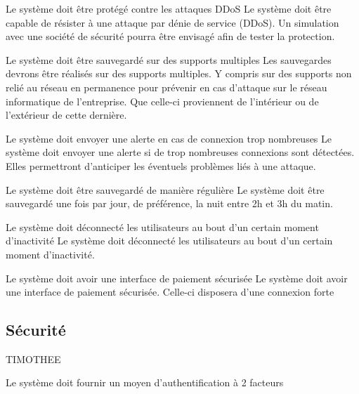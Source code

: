 \begin{reqs}{Le système doit être protégé contre les attaques DDoS}
Le système doit être capable de résister à une attaque par dénie de service (DDoS). Un simulation avec une société de sécurité pourra être envisagé afin de tester la protection.
\end{reqs}

\begin{reqs}{Le système doit être sauvegardé sur des supports multiples}
Les sauvegardes devrons être réalisés sur des supports multiples. Y compris sur des supports non relié au réseau en permanence pour prévenir en cas d'attaque sur le réseau informatique de l'entreprise. Que celle-ci proviennent de l'intérieur ou de l'extérieur de cette dernière.
\end{reqs}

\begin{reqs}{Le système doit envoyer une alerte en cas de connexion trop nombreuses}
Le système doit envoyer une alerte si de trop nombreuses connexions sont détectées. Elles permettront d'anticiper les éventuels problèmes liés à une attaque.
\end{reqs}

\begin{reqs}{Le système doit être sauvegardé de manière régulière}
Le système doit être sauvegardé une fois par jour, de préférence, la nuit entre 2h et 3h du matin.
\end{reqs}

\begin{reqs}{Le système doit déconnecté les utilisateurs au bout d'un certain moment d'inactivité}
Le système doit déconnecté les utilisateurs au bout d'un certain moment d'inactivité.
\end{reqs}

\begin{reqs}{Le système doit avoir une interface de paiement sécurisée}
Le système doit avoir une interface de paiement sécurisée. Celle-ci disposera d'une connexion forte 
\end{reqs}

\subsection{Sécurité}
TIMOTHEE\\
\begin{reqs}{Le système doit fournir un moyen d'authentification à 2 facteurs}
\end{reqs}


